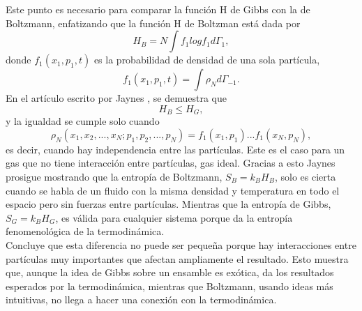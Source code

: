 Este punto es necesario para comparar la función H de Gibbs con la de Boltzmann, enfatizando que la función H de Boltzman está dada por
\begin{equation}
H_{B}=N \int f_{1} log f_{1} d\Gamma_{1},
\end{equation}
donde $f_{1}(x_{1},p_{1},t)$ es la probabilidad de densidad de una sola partícula, 
\begin{equation}
f_{1}(x_{1},p_{1},t)= \int \rho_{N} d \Gamma_{-1}.
\end{equation}
En el artículo escrito por Jaynes \cite{JaynesEntropies}, se demuestra que
\begin{equation}
H_{B} \leq H_{G},
\end{equation}
y la igualdad se cumple solo cuando 
\begin{equation}
\rho_{N}(x_{1},x_{2},...,x_{N};p_{1},p_{2},...,p_{N})=f_{1}(x_{1},p_{1})...f_{1}(x_{N},p_{N}),
\end{equation}
es decir, cuando hay independencia entre las partículas. Este es el caso para un gas que no tiene interacción entre partículas, gas ideal. Gracias a esto Jaynes prosigue mostrando que la entropía de Boltzmann, $S_{B}=k_{B}H_{B}$, solo es cierta cuando se habla de un fluido con la misma densidad y temperatura en todo el espacio pero sin fuerzas entre partículas. Mientras que la entropía de Gibbs, $S_{G}=k_{B}H_{G}$, es válida para cualquier sistema porque da la entropía fenomenológica de la termodinámica.
\\
Concluye que esta diferencia no puede ser pequeña porque hay interacciones entre partículas muy importantes que afectan ampliamente el resultado. Esto muestra que, aunque la idea de Gibbs sobre un ensamble es exótica, da los resultados esperados por la termodinámica, mientras que Boltzmann, usando ideas más intuitivas, no llega a hacer una conexión con la termodinámica.

